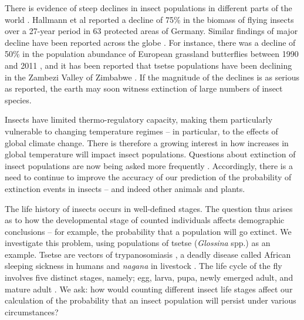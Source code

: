 \documentclass[smallextended]{svjour3}
\begin{document}
	There is evidence of steep declines in insect populations in different parts of the world \cite{Conrad2002,Potts2010,Ilyinykh2011,VanSwaay2013,Lister2018}. Hallmann et al \cite{Hallmann2017} reported a decline of 75\% in the biomass of flying insects over a 27-year period in 63 protected areas of Germany. Similar findings of major decline have been reported across the globe \cite{Habel2015,Pelton2019}. For instance, there was a decline of 50\% in the population abundance of European grassland butterflies between 1990 and 2011 \cite{VanSwaay2013}, and it has been reported that tsetse populations have been declining in the Zambezi Valley of Zimbabwe \cite{Lord2018}. If the magnitude of the declines is as serious as reported, the earth may soon witness extinction of large numbers of insect species. 
	
	Insects have limited thermo-regulatory capacity, making them particularly vulnerable to changing temperature regimes – in particular, to the effects of global climate change. There is therefore a growing interest in how increases in global temperature will impact insect populations. Questions about extinction of insect populations are now being asked more frequently \cite{Nilsson2017}. Accordingly, there is a need to continue to improve the accuracy of our prediction of the probability of extinction events in insects – and indeed other animals and plants. 
	
	The life history of insects occurs in well-defined stages. The question thus arises as to how the developmental stage of counted individuals affects demographic conclusions – for example, the probability that a population will go extinct.  We investigate this problem, using populations of tsetse (\textit{Glossina} spp.) as an example. Tsetse are vectors of trypanosomiasis \cite{Wamwiri2016,Kioy2004}, a deadly disease called African sleeping sickness in humans and \textit{nagana} in livestock \cite{Kioy2004}. The life cycle of the fly involves five distinct stages, namely; egg, larva, pupa, newly emerged adult, and mature adult \cite{Ackley2017a}. We ask: how would counting different insect life stages affect our calculation of the probability that an insect population will persist under various circumstances? 
	
\end{document}
